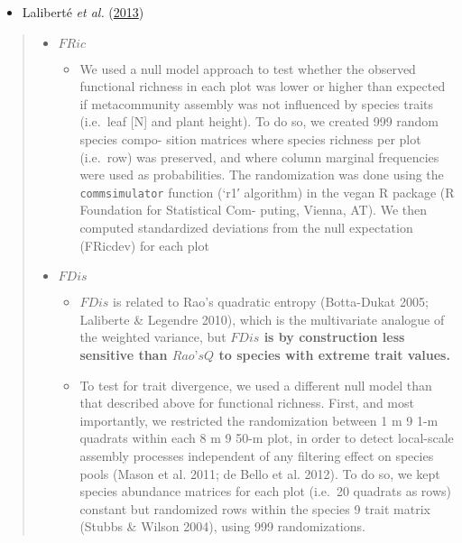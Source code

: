 \documentclass[]{article}
\providecommand{\tightlist}{%
  \setlength{\itemsep}{0pt}\setlength{\parskip}{0pt}}
\begin{document}
\begin{itemize}
\tightlist
\item
  Laliberté \emph{et al.} (\protect\hyperlink{ref-laliberte2013}{2013})
\end{itemize}

\begin{quote}
\begin{itemize}
\tightlist
\item
  \(FRic\)

  \begin{itemize}
  \tightlist
  \item
    We used a null model approach to test whether the observed
    functional richness in each plot was lower or higher than expected
    if metacommunity assembly was not influenced by species traits
    (i.e.~leaf {[}N{]} and plant height). To do so, we created 999
    random species compo- sition matrices where species richness per
    plot (i.e.~row) was preserved, and where column marginal frequencies
    were used as probabilities. The randomization was done using the
    \texttt{commsimulator} function (`r1′ algorithm) in the vegan R
    package (R Foundation for Statistical Com- puting, Vienna, AT). We
    then computed standardized deviations from the null expectation
    (FRicdev) for each plot
  \end{itemize}
\item
  \(FDis\)

  \begin{itemize}
  \tightlist
  \item
    \(FDis\) is related to Rao's quadratic entropy (Botta-Dukat 2005;
    Laliberte \& Legendre 2010), which is the multivariate analogue of
    the weighted variance, but \textbf{\(FDis\) is by construction less
    sensitive than \(Rao’s Q\) to species with extreme trait values.}
  \item
    To test for trait divergence, we used a different null model than
    that described above for functional richness. First, and most
    importantly, we restricted the randomization between 1 m 9 1-m
    quadrats within each 8 m 9 50-m plot, in order to detect local-scale
    assembly processes independent of any filtering effect on species
    pools (Mason et al. 2011; de Bello et al. 2012). To do so, we kept
    species abundance matrices for each plot (i.e.~20 quadrats as rows)
    constant but randomized rows within the species 9 trait matrix
    (Stubbs \& Wilson 2004), using 999 randomizations.
  \end{itemize}
\end{itemize}
\end{quote}
\end{document}
